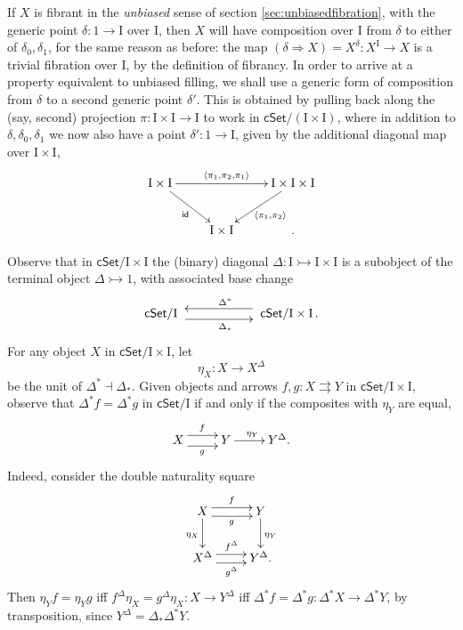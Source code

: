 \documentclass[11pt]{article}
\newcommand{\cSet}{\ensuremath{\mathsf{cSet}}}
\newcommand{\mono}{\ensuremath{\rightarrowtail}}
\newcommand{\ra}{\ensuremath{\rightarrow}}
\newcommand{\I}{\ensuremath{\mathrm{I}}}
\theoremstyle{remark}
\theoremstyle{definition}
\begin{document}
If $X$ is fibrant in the \emph{unbiased} sense of section \ref{sec:unbiasedfibration}, with the generic point $\delta : 1\ra \I$ over $\I$, then $X$  will have composition over $\I$ from $\delta$ to either of $\delta_0, \delta_1$, for the same reason as before: the map $(\delta\!\Rightarrow\!X) = X^\delta : X^\I \to X$ is a trivial fibration over $\I$, by the definition of fibrancy. In order to arrive at a property equivalent to unbiased filling, we shall use a generic form of composition from $\delta$ to a second generic point $\delta'$.  This is obtained by pulling back along the (say, second) projection $\pi : \I\times\I \ra \I$ to work in $\cSet/(\I\times\I)$, where in addition to $\delta, \delta_0, \delta_1$ we now also have a point $\delta' : 1 \ra \I$, given by the additional diagonal map over $\I\times \I$,
\begin{equation}\label{diagram:deltaprime}
\xymatrix{
\I\times\I  \ar[rd]_{\mathsf{id}} \ar[rr]^{\langle \pi_1, \pi_2, \pi_1\rangle}  && \I\times\I\times\I \ar[ld]^{\langle \pi_1, \pi_2\rangle} \\
&  \I\times\I &.
}
\end{equation}

Observe that in $\cSet/\I\times\I$ the (binary) diagonal $\Delta : \I\mono \I\times\I$ is a subobject of the terminal object $\Delta\mono 1$, with associated base change 
\begin{equation}\label{diagram:Deltabasechange}
\xymatrix{
\cSet/\I\ \ar@<-1ex>[rr]_{\Delta_*}  && \ar@<-1ex>[ll]_{\Delta^*} \ \cSet/\I\times\I \,.
}
\end{equation}
%
For any object $X$ in $\cSet/\I\times\I$, let $$\eta_X : X\ra X^\Delta$$ be the unit of $\Delta^*\dashv \Delta_*$.  
Given objects and arrows $f, g : X \rightrightarrows Y$ in $\cSet/\I\times\I$, observe that
 $\Delta^*f = \Delta^*g$ in $\cSet/\I$ if and only if the composites with $\eta_Y$ are equal,
\begin{equation}\label{diagram:composeDelta}
\xymatrix{
X \ar@<-1ex>[r]_{g}  \ar@<1ex>[r]^{f} & Y \ar[r]^{\eta_Y} & Y^\Delta.
}
\end{equation}
%
Indeed, consider the double naturality square
\begin{equation}\label{diagram:Deltanatural}
\xymatrix{
X \ar[d]_{\eta_X} \ar@<-.8ex>[r]_{g}  \ar@<.8ex>[r]^{f} & Y \ar[d]^{\eta_Y} \\
X^\Delta \ar@<-.8ex>[r]_{g^\Delta}  \ar@<.8ex>[r]^{f^\Delta} & Y^\Delta.
}
\end{equation}
Then $\eta_Y f = \eta_Y g$ iff $f^\Delta \eta_X= g^\Delta \eta_X : X\ra Y^\Delta$ iff $\Delta^*f = \Delta^*g : \Delta^*X \ra\Delta^*Y$, by transposition, since $Y^\Delta = \Delta_*\Delta^* Y$.
\end{document}
